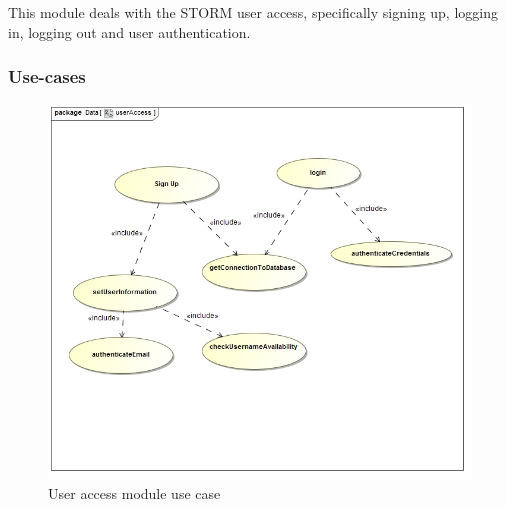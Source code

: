 This module deals with the STORM user access, specifically signing up, logging in, logging out and user authentication.

\subsubsection{Use-cases}
\begin{figure}[h]
    \centering
\includegraphics[width=15cm]{./graphics/userAccessUseCase.jpg}
    \caption{ User access module use case}
\end{figure}

